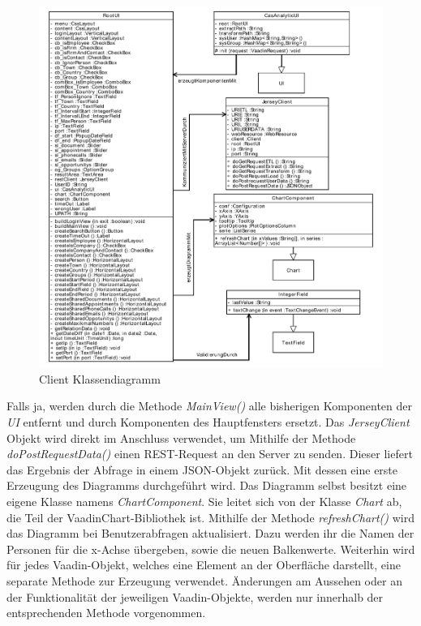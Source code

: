 \begin{figure}[H]
\begin{center}
\includegraphics[width=1.0\textwidth]{pics/ClientKlassendiagramm.pdf}
\caption{Client Klassendiagramm}
\label{umsetzung_klassendiagramm_client}
\end{center}
\end{figure}

Falls ja, werden durch die Methode \textit{MainView()} alle bisherigen Komponenten der \textit{UI} entfernt und durch Komponenten des Hauptfensters ersetzt. Das \textit{JerseyClient} Objekt wird direkt im Anschluss verwendet, um Mithilfe der Methode \textit{doPostRequestData()} einen REST-Request an den Server zu senden. Dieser liefert das Ergebnis der Abfrage in einem JSON-Objekt zurück. Mit dessen eine erste Erzeugung des Diagramms durchgeführt wird. Das Diagramm selbst besitzt eine eigene Klasse namens \textit{ChartComponent}. Sie leitet sich von der Klasse \textit{Chart} ab, die Teil der VaadinChart-Bibliothek ist. Mithilfe der Methode \textit{refreshChart()} wird das Diagramm bei Benutzerabfragen aktualisiert. Dazu werden ihr die Namen der Personen für die x-Achse übergeben, sowie die neuen Balkenwerte. Weiterhin wird für jedes Vaadin-Objekt, welches eine Element an der Oberfläche darstellt, eine separate Methode zur Erzeugung verwendet. Änderungen am Aussehen oder an der Funktionalität der jeweiligen Vaadin-Objekte, werden nur innerhalb der entsprechenden Methode vorgenommen.

